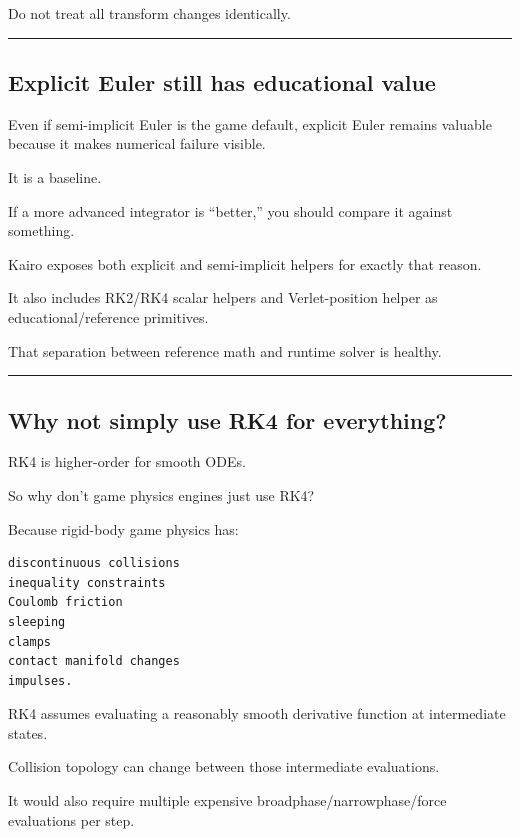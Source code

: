 Do not treat all transform changes identically.

\begin{center}\rule{0.5\linewidth}{0.5pt}\end{center}

\subsection{Explicit Euler still has educational value}\label{06-engine-ii-ch038-explicit-euler-still-has-educational-value}

Even if semi-implicit Euler is the game default, explicit Euler remains valuable because it makes numerical failure visible.

It is a baseline.

If a more advanced integrator is ``better,'' you should compare it against something.

Kairo exposes both explicit and semi-implicit helpers for exactly that reason.

It also includes RK2/RK4 scalar helpers and Verlet-position helper as educational/reference primitives.

That separation between reference math and runtime solver is healthy.

\begin{center}\rule{0.5\linewidth}{0.5pt}\end{center}

\subsection{Why not simply use RK4 for everything?}\label{06-engine-ii-ch038-why-not-simply-use-rk4-for-everything}

RK4 is higher-order for smooth ODEs.

So why don't game physics engines just use RK4?

Because rigid-body game physics has:

\begin{verbatim}
discontinuous collisions
inequality constraints
Coulomb friction
sleeping
clamps
contact manifold changes
impulses.
\end{verbatim}

RK4 assumes evaluating a reasonably smooth derivative function at intermediate states.

Collision topology can change between those intermediate evaluations.

It would also require multiple expensive broadphase/narrowphase/force evaluations per step.

